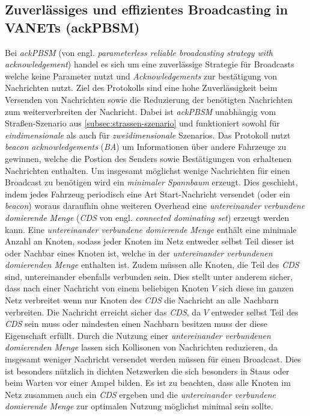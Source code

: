 \documentclass[english,runningheads,a4paper]{llncs}[2018/03/10]
\begin{document}
\subsection{Zuverlässiges und effizientes Broadcasting in VANETs (ackPBSM)}
Bei \textit{ackPBSM} (von engl. \textit{parameterless reliable broadcasting strategy with acknowledgement}) handel es sich um eine zuverlässige Strategie für Broadcasts welche keine Parameter nutzt und \textit{Acknowledgements} zur bestätigung von Nachrichten nutzt.
Ziel des Protokolls sind eine hohe Zuverlässigkeit beim Versenden von Nachrichten sowie die Reduzierung der benötigten Nachrichten zum weiterverbreiten der Nachricht.
Dabei ist \textit{ackPBSM} unabhängig vom Straßen-Szenario aus \ref{subsec:strassen-szenario} und funktioniert sowohl für \textit{eindimensionale} als auch für \textit{zweidimensionale} Szenarios.
Das Protokoll nutzt \textit{beacon acknowledgements} (\textit{BA}) um Informationen über andere Fahrzeuge zu gewinnen, welche die Postion des Senders sowie Bestätigungen von erhaltenen Nachrichten enthalten.
Um insgesamt möglichst wenige Nachrichten für einen Broadcast zu benötigen wird ein \textit{minimaler Spannbaum} erzeugt.
Dies geschieht, indem jedes Fahrzeug periodisch eine Art Start-Nachricht versendet (oder ein \textit{beacon}) woraus daraufhin ohne weiteren Overhead eine \textit{untereinander verbundene domierende Menge} (\textit{CDS} von engl. \textit{connected dominating set}) erzeugt werden kann.
Eine \textit{untereinander verbundene domierende Menge} enthält eine minimale Anzahl an Knoten, sodass jeder Knoten im Netz entweder selbst Teil dieser ist oder Nachbar eines Knoten ist, welche in der \textit{untereinander verbundenen domierenden Menge} enthalten ist.
Zudem müssen alle Knoten, die Teil des \textit{CDS} sind, untereinander ebenfalls verbunden sein.
Dies stellt unter anderem sicher, dass nach einer Nachricht von einem beliebigen Knoten $V$ sich diese im ganzen Netz verbreitet wenn nur Knoten des \textit{CDS} die Nachricht an alle Nachbarn verbreiten.
Die Nachricht erreicht sicher das \textit{CDS}, da $V$ entweder selbst Teil des \textit{CDS} sein muss oder mindesten einen Nachbarn besitzen muss der diese Eigenschaft erfüllt.
Durch die Nutzung einer \textit{untereinander verbundenen domierenden Menge} lassen sich Kollisonen von Nachrichten reduzieren, da insgesamt weniger Nachricht versendet werden müssen für einen Broadcast.
Dies ist besonders nützlich in dichten Netzwerken die sich besonders in Staus oder beim Warten vor einer Ampel bilden.
Es ist zu beachten, dass alle Knoten im Netz zusammen auch ein \textit{CDS} ergeben und die \textit{untereinander verbundene domierende Menge} zur optimalen Nutzung möglichst minimal sein sollte\cite{conti2013mobile}.\\
\end{document}
